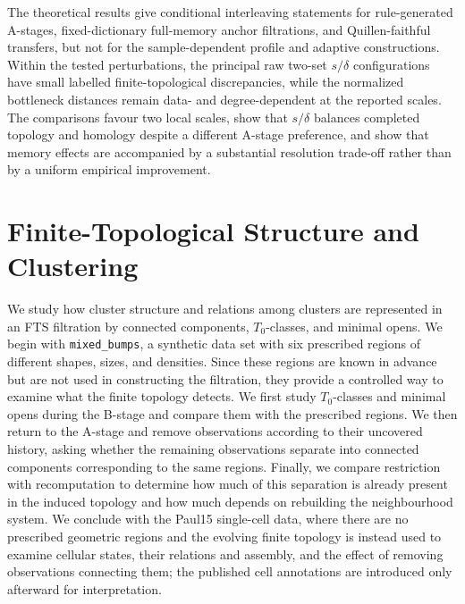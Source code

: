 \documentclass[a4paper,11pt]{article}
\theoremstyle{definition}
\theoremstyle{remark}
\begin{document}
The theoretical results give conditional interleaving statements for rule-generated A-stages, fixed-dictionary full-memory anchor filtrations, and Quillen-faithful transfers, but not for the sample-dependent profile and adaptive constructions. Within the tested perturbations, the principal raw two-set $s/\delta$ configurations have small labelled finite-topological discrepancies, while the normalized bottleneck distances remain data- and degree-dependent at the reported scales. The comparisons favour two local scales, show that $s/\delta$ balances completed topology and homology despite a different A-stage preference, and show that memory effects are accompanied by a substantial resolution trade-off rather than by a uniform empirical improvement.



\section{Finite-Topological Structure and Clustering}
\label{sec:clustering}

We study how cluster structure and relations among clusters are represented in an FTS filtration by connected components, $T_0$-classes, and minimal opens. We begin with \texttt{mixed\_bumps}, a synthetic data set with six prescribed regions of different shapes, sizes, and densities. Since these regions are known in advance but are not used in constructing the filtration, they provide a controlled way to examine what the finite topology detects. We first study $T_0$-classes and minimal opens during the B-stage and compare them with the prescribed regions. We then return to the A-stage and remove observations according to their uncovered history, asking whether the remaining observations separate into connected components corresponding to the same regions. Finally, we compare restriction with recomputation to determine how much of this separation is already present in the induced topology and how much depends on rebuilding the neighbourhood system. We conclude with the Paul15 single-cell data, where there are no prescribed geometric regions and the evolving finite topology is instead used to examine cellular states, their relations and assembly, and the effect of removing observations connecting them; the published cell annotations are introduced only afterward for interpretation.
\end{document}
